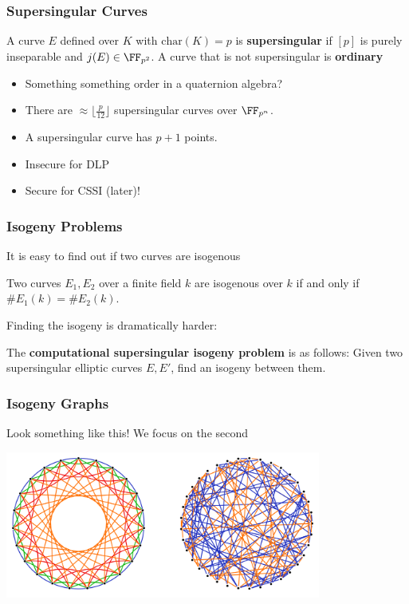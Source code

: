 \documentclass{beamer}
\begin{document}
\begin{frame}
    \frametitle{Supersingular Curves}
    \begin{definition}
        A curve $E$ defined over $K$ with $\mathrm{char}(K) = p$ is \textbf{supersingular}
        if $[p]$ is purely inseparable and $j(E) \in \FF_{p^2}$. 
        A curve that is not supersingular is \textbf{ordinary}
    \end{definition}
    \begin{itemize}
        \item Something something order in a quaternion algebra?
        \item There are $\approx \lfloor \frac{p}{12} \rfloor$ supersingular curves over $\FF_{p^n}$.
        \item A supersingular curve has $p + 1$ points.
        \item Insecure for DLP
        \item Secure for CSSI (later)!
    \end{itemize}
    

\end{frame}

\begin{frame}
    \frametitle{Isogeny Problems}
    It is easy to find out if two curves are isogenous
    \begin{theorem}
        Two curves $E_1, E_2$ over a finite field $k$ are isogenous over $k$ if and only if $\#E_1(k) = \#E_2(k)$.
    \end{theorem}
   Finding the isogeny is dramatically harder:
   \begin{definition}
       The \textbf{computational supersingular isogeny problem} is as follows:
       Given two supersingular elliptic curves $E, E'$, find an isogeny between them. 
   \end{definition}
\end{frame}

\begin{frame}
    \frametitle{Isogeny Graphs}
    Look something like this! We focus on the second
    \begin{center}
        \includegraphics[width=28em]{isogeny_graph.PNG}
    \end{center}
\end{frame}
\end{document}
